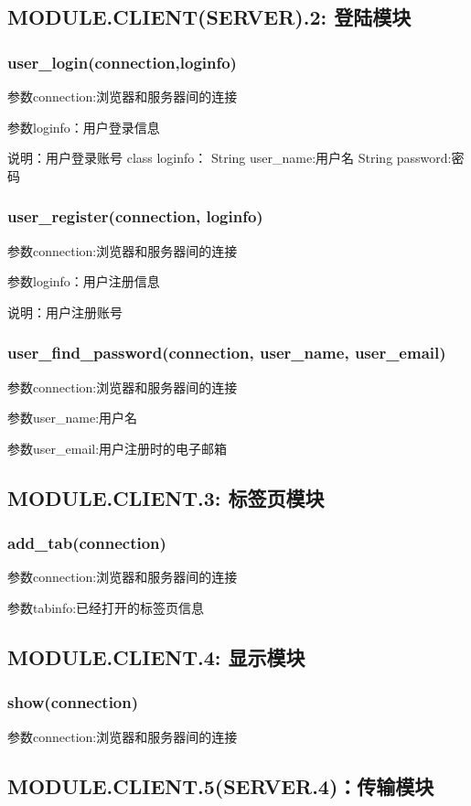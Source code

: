 \subsection{MODULE.CLIENT(SERVER).2: 登陆模块}

\subsubsection{user\_login(connection,loginfo)}
参数connection:浏览器和服务器间的连接

参数loginfo：用户登录信息

说明：用户登录账号
class loginfo：
String user\_name:用户名
String password:密码
\subsubsection{user\_register(connection, loginfo)}
参数connection:浏览器和服务器间的连接

参数loginfo：用户注册信息

说明：用户注册账号
\subsubsection{user\_find\_password(connection, user\_name, user\_email)}
参数connection:浏览器和服务器间的连接

参数user\_name:用户名

参数user\_email:用户注册时的电子邮箱

\subsection{MODULE.CLIENT.3: 标签页模块}

\subsubsection{add\_tab(connection)}
参数connection:浏览器和服务器间的连接

参数tabinfo:已经打开的标签页信息
\subsection{MODULE.CLIENT.4: 显示模块}

\subsubsection{show(connection)}
参数connection:浏览器和服务器间的连接

\subsection{MODULE.CLIENT.5(SERVER.4)：传输模块}
